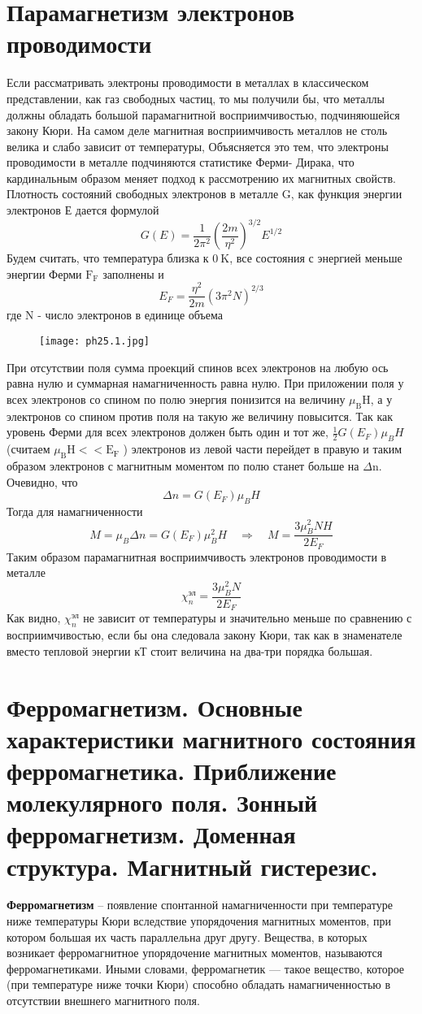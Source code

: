\section{Парамагнетизм электронов проводимости}
Если рассматривать электроны проводимости в металлах в классическом представлении, как газ свободных частиц, то мы получили бы, что металлы должны обладать большой парамагнитной восприимчивостью, подчиняюшейся закону Кюри. На самом деле магнитная восприимчивость металлов не столь велика и слабо зависит от температуры, Объясняется это тем, что электроны проводимости в металле подчиняются статистике Ферми- Дирака, что кардинальным образом меняет подход к рассмотрению их магнитных свойств.
Плотность состояний свободных электронов в металле $\mathrm{G}$, как функция энергии электронов Е дается формулой
$$
G(E)=\frac{1}{2 \pi^2}\left(\frac{2 m}{\eta^2}\right)^{3 / 2} E^{1 / 2}
$$
Будем считать, что температура близка к $0 \mathrm{~K}$, все состояния с энергией меньше энергии Ферми $\mathrm{F}_{\mathrm{F}}$ заполнены и
$$
E_F=\frac{\eta^2}{2 m}\left(3 \pi^2 N\right)^{2 / 3}
$$
где $\mathrm{N}$ - число электронов в единице объема
\begin{figure}[h!]
    \centering
    \texttt{[image: ph25.1.jpg]}
\end{figure}
При отсутствии поля сумма проекций спинов всех электронов на любую ось равна нулю и суммарная намагниченность равна нулю. При приложении поля у всех электронов со спином по полю энергия понизится на величину $\mu_{\mathrm{B}} \mathrm{H}$, а у электронов со спином против поля на такую же величину повысится. Так как уровень Ферми для всех электронов должен быть один и тот же, $ \frac{1}{2} G(E_F) \mu_{B} H$ 
(считаем $\mu_{\mathrm{B}} \mathrm{H}<<\mathrm{E}_{\mathrm{F}}$ ) электронов из левой части перейдет в правую  и таким образом электронов с магнитным моментом по полю станет больше на $\Delta \mathrm{n}$. Очевидно, что
$$
\Delta n=G\left(E_F\right) \mu_B H
$$
Тогда для намагниченности
$$
M=\mu_B \Delta n=G\left(E_F\right) \mu_B^2 H \quad
\Rightarrow \quad
M=\frac{3 \mu_B^2 N H}{2 E_F}
$$
Таким образом парамагнитная восприимчивость электронов проводимости в металле
$$
\chi_n^{\text{эл}}=\frac{3 \mu_B^2 N}{2 E_F}
$$
Как видно, $\chi_n^{\text{эл}}$ не зависит от температуры и значительно меньше по сравнению с восприимчивостью, если бы она следовала закону Кюри, так как в знаменателе вместо тепловой энергии кТ стоит величина на два-три порядка большая.

\section{Ферромагнетизм. Основные характеристики магнитного состояния ферромагнетика. Приближение молекулярного поля. Зонный ферромагнетизм. Доменная структура. Магнитный гистерезис.}
\textbf{Ферромагнетизм} – появление спонтанной намагниченности при температуре
ниже температуры Кюри вследствие упорядочения магнитных моментов, при котором
большая их часть параллельна друг другу. Вещества, в которых возникает ферромагнитное
упорядочение магнитных моментов, называются ферромагнетиками. Иными словами, ферромагнетик — такое вещество, которое
(при температуре ниже точки Кюри) способно обладать намагниченностью в отсутствии
внешнего магнитного поля.



